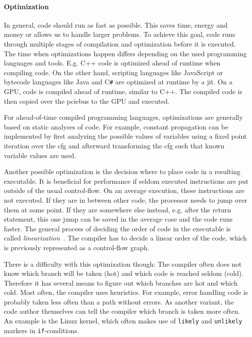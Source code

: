\paragraph{Optimization} In general, code should run as fast as possible. This saves time, energy and money or allows us to handle larger problems.
To achieve this goal, code runs through multiple stages of compilation and optimization before it is executed.
The time when optimizations happen differs depending on the used programming languages and tools.
E.g. C++ code is optimized ahead of runtime when compiling code. On the other hand, scripting languages like JavaScript or bytecode languages like Java and C\texttt{\#} are optimized at runtime by a \gls{jit}.
On a GPU, code is compiled ahead of runtime, similar to C++. The compiled code is then copied over the \gls{pciebus} to the GPU and executed.

For ahead-of-time compiled programming languages, optimizations are generally based on static analyses of code. For example, constant propagation can be implemented by first analyzing the possible values of variables using a fixed point iteration over the \gls{cfg} and afterward transforming the \gls{cfg} such that known variable values are used.~\cite{Seidl2010}

Another possible optimization is the decision where to place code in a resulting executable.
It is beneficial for performance if seldom executed instructions are put outside of the usual control-flow.
On an average execution, these instructions are not executed.
If they are in between other code, the processor needs to jump over them at some point.
If they are somewhere else instead, e.g. after the return statement, this one jump can be saved in the average case and the code runs faster.
The general process of deciding the order of code in the executable is called \emph{linearization}~\cite{Seidl2010}.
The compiler has to decide a linear order of the code, which is previously represented as a control-flow graph.

There is a difficulty with this optimization though: The compiler often does not know which branch will be taken (hot) and which code is reached seldom (cold). Therefore it has several means to figure out which branches are hot and which cold. Most often, the compiler uses heuristics. For example, error handling code is probably taken less often than a path without errors. As another variant, the code author themselves can tell the compiler which branch is taken more often. An example is the Linux kernel, which often makes use of \texttt{likely} and \texttt{unlikely} markers in \texttt{if}-conditions.

